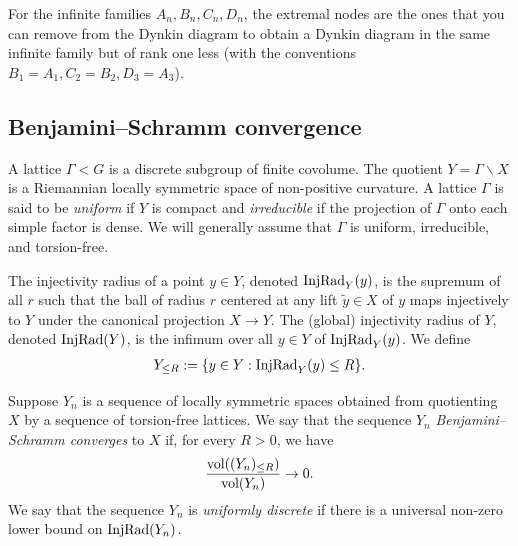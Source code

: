 \documentclass[12pt]{amsart}
\theoremstyle{remark}
\begin{document}
For the infinite families $A_n, B_n, C_n, D_n$, the extremal nodes are the ones that you can remove from the Dynkin diagram to obtain a Dynkin diagram in the same infinite family but of rank one less (with the conventions $B_1 = A_1, C_2 = B_2, D_3 = A_3$).



\subsection{Benjamini--Schramm convergence}\label{sec:BS}
A lattice $\Gamma < G$ is a discrete subgroup of finite covolume. The quotient $Y=\Gamma \backslash X$ is a Riemannian locally symmetric space of non-positive curvature. A lattice $\Gamma$ is said to be \textit{uniform} if $Y$ is compact and \textit{irreducible} if the projection of $\Gamma$ onto each simple factor is dense. We will generally assume that $\Gamma$ is uniform, irreducible, and torsion-free.

The injectivity radius of a point $y \in Y$, denoted $\textnormal{InjRad}_Y(y)$, is the supremum of all $r$ such that the ball of radius $r$ centered at any lift $\tilde{y} \in X$ of $y$ maps injectively to $Y$ under the canonical projection $X \to Y$. The (global) injectivity radius of $Y$, denoted $\textnormal{InjRad}(Y)$, is the infimum over all $y \in Y$ of $\textnormal{InjRad}_Y(y)$. We define
\begin{gather*}
    Y_{\leq R} := \{y \in Y: \textnormal{InjRad}_{Y}(y) \leq R\}.
\end{gather*}

Suppose $Y_n$ is a sequence of locally symmetric spaces obtained from quotienting $X$ by a sequence of torsion-free lattices. We say that the sequence $Y_n$ \textit{Benjamini--Schramm converges} to $X$ if, for every $R > 0$, we have
\begin{gather*}
    \frac{\textnormal{vol}((Y_n)_{\leq R})}{\textnormal{vol}(Y_n)} \to 0.
\end{gather*}
We say that the sequence $Y_n$ is \textit{uniformly discrete} if there is a universal non-zero lower bound on $\textnormal{InjRad}(Y_n)$.
\end{document}

